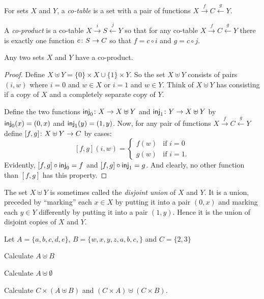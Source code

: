 \begin{defn}
	For sets $X$ and $Y$, a \emph{co-table} is a set with a pair of functions
	$X\stackrel{f}{\longrightarrow}C\stackrel{g}{\longleftarrow}Y$.
	
	A \emph{co-product} is a co-table $X\stackrel{i}{\longrightarrow}S\stackrel{j}{\longleftarrow}Y$
	so that for any co-table $X\stackrel{f}{\longrightarrow}C\stackrel{g}{\longleftarrow}Y$
	there is exactly one function ${c}\colon{S}\to{C}$ so that $f = c\circ i$ and
	$g = c\circ j$. 
\end{defn}

\begin{lemma}
	Any two sets $X$ and $Y$ have a co-product.
	
	\begin{proof}
		Define $X\uplus Y = \{0\}\times X \cup \{1\}\times Y$.
		So the set $X\uplus Y$ consists of pairs
		$(i,w)$ where $i=0$ and $w\in X$ or $i=1$ and $w\in Y$.
		Think of $X\uplus Y$ has consisting if a copy of $X$ and a completely separate copy of $Y$.
		
		Define the two functions ${\mathord{\textsf{inj}}_0}\colon{X}\to{X\uplus Y}$ and ${\mathord{\textsf{inj}}_1}\colon{Y}\to{X\uplus Y}$ by $\mathord{\textsf{inj}}_0(x) = (0,x)$ and $\mathord{\textsf{inj}}_1(y) = (1,y)$. 
		Now, for any pair of functions $X\stackrel{f}{\longrightarrow}C\stackrel{g}{\longleftarrow}Y$
		define ${[f,g]}\colon{X\uplus Y}\to{C}$ by cases:
		\[[f,g](i,w) = \begin{cases}
		f(w) &\text{if $i=0$}\\
		g(w) &\text{if $i=1$.}
		\end{cases}\]
		Evidently, $[f,g]\circ \mathord{\textsf{inj}}_0 = f$ and $[f,g]\circ\mathord{\textsf{inj}}_1 = g$. And clearly, no other function than $[f,g]$ has this property.		
	\end{proof}
\end{lemma}

The set $X\uplus Y$ is sometimes called the \emph{disjoint union} of $X$ and $Y$. It is a union, preceded by ``marking'' each $x\in X$ by putting it into a pair $(0,x)$ and marking each $y\in Y$ differently by putting it into a pair $(1,y)$. Hence it is the union of disjoint copies of $X$ and $Y$.

\begin{exercises}
	Let $A= \{a,b,c,d,e\}$, $B = \{w,x,y,z,a,b,c,\}$ and $C=\{2,3\}$
    	\begin{firstexercise}
		\item Calculate $A\uplus B$
		\item Calculate $A\uplus \emptyset$
		\item Calculate
		$C\times (A\uplus B)$ and $(C\times A )\uplus (C\times B)$.
	\end{firstexercise}
\end{exercises}

